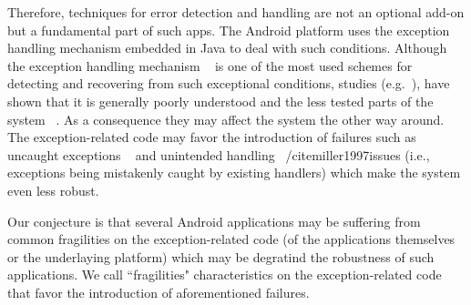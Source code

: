 \documentclass[conference]{IEEEtran}
\begin{document}

Therefore, techniques for error detection and handling are not  an optional add-on but a 
fundamental part of such apps.
The Android platform uses the exception handling mechanism embedded
 in Java to deal with such conditions. Although the exception handling mechanism
~\cite{goodenough1975exception} is one of the most used schemes for
detecting and recovering from such exceptional conditions, studies (e.g.~\cite{miller1997issues,Robil00,shah2010understanding, garcia2007extracting,garcia2001comparative,cabral2007exception,coelho2011unveiling}),
have shown that it is generally poorly understood and the less tested parts of the system ~\cite{coelho2011unveiling}.
As a consequence they may affect the system the other way around.
The exception-related code may favor the introduction of failures such as uncaught exceptions ~\cite{jo2004uncaught, zhang2012amplifying}
and unintended handling ~/cite{miller1997issues} (i.e., exceptions being mistakenly caught by existing handlers) 
which make the system even less robust.



Our conjecture is that several Android applications may be suffering from common 
fragilities on the exception-related code (of the applications themselves or 
the underlaying platform) which may be degratind the robustness of such applications.
We call ``fragilities" characteristics on the exception-related code that favor the introduction
of aforementioned failures.

\end{document}
